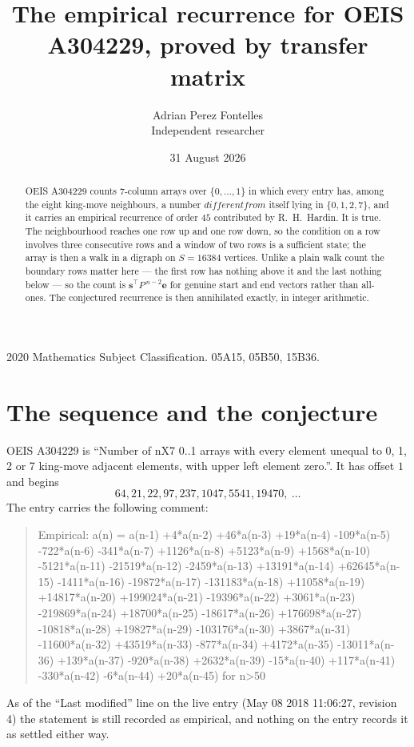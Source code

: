 \documentclass[11pt,a4paper]{article}
\title{The empirical recurrence for OEIS A304229, proved by transfer matrix}
\author{Adrian Perez Fontelles\\ \small Independent researcher}
\date{31 August 2026}
\theoremstyle{plain}
\theoremstyle{definition}
\begin{document}
\maketitle

\begin{abstract}
OEIS A304229 counts $7$-column arrays over $\{0,\dots,1\}$ in which every entry has,
among the eight king-move neighbours, a number $different from$ itself lying in $\{0,1,2,7\}$, and it carries an empirical
recurrence of order $45$ contributed by R.~H.~Hardin. It is true. The neighbourhood
reaches one row up and one row down, so the condition on a row involves three consecutive
rows and a window of two rows is a sufficient state; the array is then a walk in a digraph
on $S=16384$ vertices. Unlike a plain walk count the boundary rows matter here --- the first
row has nothing above it and the last nothing below --- so the count is
$\mathbf{s}^{\!\top}P^{\,n-2}\mathbf{e}$ for genuine start and end vectors rather than
all-ones. The conjectured recurrence is then annihilated exactly, in integer arithmetic.
\end{abstract}

\noindent\small 2020 Mathematics Subject Classification. 05A15, 05B50, 15B36.\normalsize

\section{The sequence and the conjecture}

OEIS A304229 is ``Number of nX7 0..1 arrays with every element unequal to 0, 1, 2 or 7 king-move adjacent elements, with upper left element zero.''. It has offset
$1$ and begins
\[
64, 21, 22, 97, 237, 1047, 5541, 19470,\ \dots
\]
The entry carries the following comment:
\begin{quote}\small
Empirical: a(n) = a(n-1) +4*a(n-2) +46*a(n-3) +19*a(n-4) -109*a(n-5) -722*a(n-6) -341*a(n-7) +1126*a(n-8) +5123*a(n-9) +1568*a(n-10) -5121*a(n-11) -21519*a(n-12) -2459*a(n-13) +13191*a(n-14) +62645*a(n-15) -1411*a(n-16) -19872*a(n-17) -131183*a(n-18) +11058*a(n-19) +14817*a(n-20) +199024*a(n-21) -19396*a(n-22) +3061*a(n-23) -219869*a(n-24) +18700*a(n-25) -18617*a(n-26) +176698*a(n-27) -10818*a(n-28) +19827*a(n-29) -103176*a(n-30) +3867*a(n-31) -11600*a(n-32) +43519*a(n-33) -877*a(n-34) +4172*a(n-35) -13011*a(n-36) +139*a(n-37) -920*a(n-38) +2632*a(n-39) -15*a(n-40) +117*a(n-41) -330*a(n-42) -6*a(n-44) +20*a(n-45) for n>50
\end{quote}
As of the ``Last modified'' line on the live entry (May 08 2018 11:06:27, revision
4) the statement is still recorded as empirical, and nothing on the entry
records it as settled either way.
\end{document}
